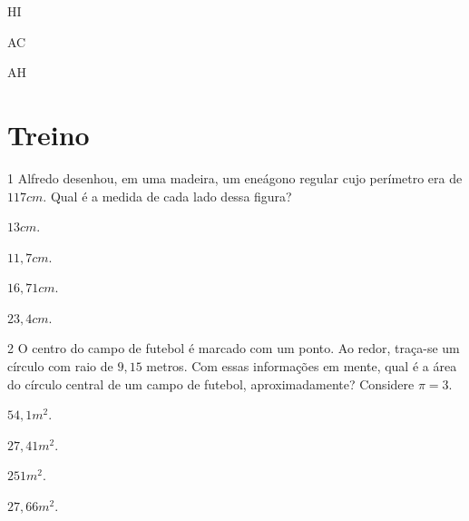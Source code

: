 {{{\begin{escolha}
\item HI

\item AC

\item AH

\end{escolha}


\section*{Treino}

\num{1} Alfredo desenhou, em uma madeira, um eneágono regular cujo perímetro
era de $117 cm$. Qual é a medida de cada lado dessa figura?


\begin{escolha}[itemsep=0pt]
\item $13 cm$.
\item $11,7 cm$.
\item $16,71 cm$.
\item $23,4 cm$.
\end{escolha}







\num{2} O centro do campo de futebol é marcado com um ponto. Ao redor,
traça-se um círculo com raio de $9,15$ metros. Com essas informações em
mente, qual é a área do círculo central de um campo de futebol,
aproximadamente? Considere $\pi = 3$.

\begin{escolha}[itemsep=0pt]
\item $54,1 m^2$.
\item $27,41 m^2$.
\item $251 m^2$.
\item $27,66 m^2$.
\end{escolha}

}}}
